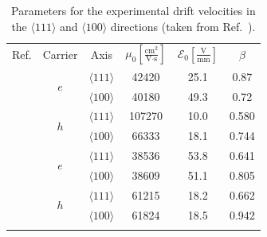 \documentclass[epj]{svjour}
\begin{document}
\begin{table}[htpb]
\centering
\caption{Parameters for the experimental drift velocities in the
$\langle111\rangle$ and $\langle 100 \rangle$ directions
(taken from Ref.~\cite{bart}).}
\label{t:pars}
\begin{tabular}{cccccc}
\hline\noalign{\smallskip}
Ref. & Carrier & Axis &
$\mu_{0} \left[\frac{\mbox{cm}^{2}}{\mbox{V}\cdot\mbox{s}}\right]$ &
$\mathcal{E}_{0}\left[\frac{\mbox{V}}{\mbox{mm}}\right]$ & $\beta$\\
\noalign{\smallskip}\hline\noalign{\smallskip}

\multirow{2}{*}{\cite{miha}}&\multirow{2}{*}{$e$} &
$\langle111\rangle$ & 42420 & 25.1 & 0.87 \\
& & $\langle100\rangle$ & 40180 & 49.3 & 0.72 \\
\noalign{\smallskip}\hline\noalign{\smallskip}

\multirow{2}{*}{\cite{reg}}&\multirow{2}{*}{$h$} &
$\langle111\rangle$ & 107270 & 10.0 & 0.580 \\
& & $\langle100\rangle$ & 66333 & 18.1 & 0.744 \\
\noalign{\smallskip}\hline\noalign{\smallskip}

\multirow{4}{*}{\cite{bart}}&\multirow{2}{*}{$e$} &
$\langle111\rangle$ & 38536 & 53.8 & 0.641 \\
& & $\langle100\rangle$ & 38609 & 51.1 & 0.805 \\
\noalign{\smallskip}\cline{2-6}\noalign{\smallskip}

&\multirow{2}{*}{$h$} & $\langle111\rangle$ & 61215 & 18.2 & 0.662 \\ 
& & $\langle100\rangle$ & 61824 & 18.5 & 0.942 \\
\noalign{\smallskip}\hline\noalign{\smallskip}
\end{tabular} 
\end{table}
 
\end{document}
